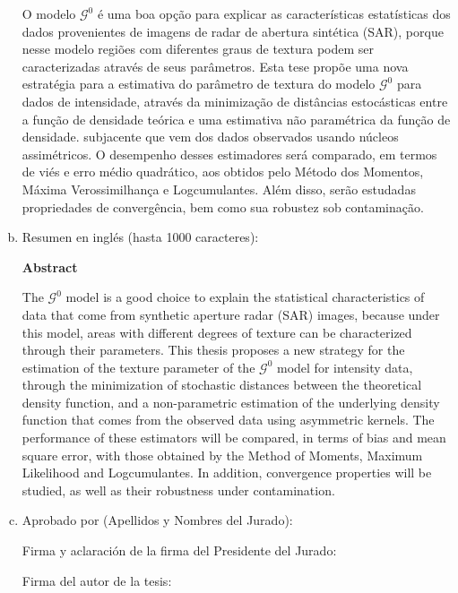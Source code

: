 \begin{enumerate}[a)]
	O modelo $ \mathcal {G}^0$ é uma boa opção para explicar as características estatísticas dos dados provenientes de imagens de radar de abertura sintética (SAR), porque nesse modelo regiões com diferentes graus de textura podem ser caracterizadas através de seus parâmetros. Esta tese propõe uma nova estratégia para a estimativa do parâmetro de textura do modelo $\mathcal{G}^0$ para dados de intensidade, através da minimização de distâncias estocásticas entre a função de densidade teórica e uma estimativa não paramétrica da função de densidade. subjacente que vem dos dados observados usando núcleos assimétricos. O desempenho desses estimadores será comparado, em termos de viés e erro médio quadrático, aos obtidos pelo Método dos Momentos, Máxima Verossimilhança e Logcumulantes. Além disso, serão estudadas propriedades de convergência, bem como sua robustez sob contaminação.
	
	\item Resumen en inglés (hasta 1000 caracteres):
	
	\textbf{Abstract}
	
	The $\mathcal{G}^0$ model is a good choice to explain the statistical characteristics of data that come from synthetic aperture radar (SAR) images, because under this model, areas with different degrees of texture can be characterized through their parameters. This thesis proposes a new strategy for the estimation of the texture parameter of the $\mathcal G^0 $ model for intensity data, through the minimization of stochastic distances between the theoretical density function, and a non-parametric estimation of the underlying density function that comes from the observed data using asymmetric kernels. The performance of these estimators will be compared, in terms of bias and mean square error, with those obtained by the Method of Moments, Maximum Likelihood and Logcumulantes. In addition, convergence properties will be studied, as well as their robustness under contamination.
	
	\item Aprobado por (Apellidos y Nombres del Jurado):
%	
	
	\bigskip\bigskip\bigskip\bigskip
	
	Firma y aclaración de la firma del Presidente del Jurado:			
	

	
	\bigskip\bigskip\bigskip\bigskip
	
	Firma del autor de la tesis:
	
\end{enumerate}

